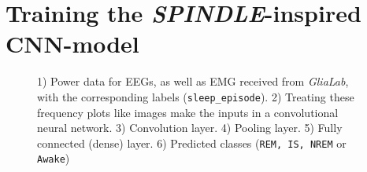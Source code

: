 \documentclass{article}
\begin{document}
\section*{Training the \textit{SPINDLE}-inspired CNN-model}

\begin{figure}[H]
    \centering
    \caption{1) Power data for EEGs, as well as EMG received from \textit{GliaLab}, with the corresponding labels (\texttt{sleep\_episode}). 2) Treating these frequency plots like images make the inputs in a convolutional neural network. 3) Convolution layer. 4) Pooling layer. 5) Fully connected (dense) layer. 6) Predicted classes (\texttt{REM, IS, NREM} or \texttt{Awake})}
    \label{fig:cnn}
\end{figure}
\end{document}
